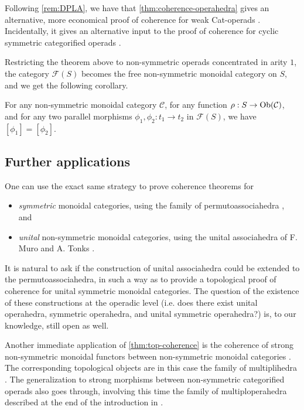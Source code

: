Following \cref{rem:DPLA}, we have that \cref{thm:coherence-operahedra} gives an alternative, more economical proof of coherence for weak Cat-operads \cite[Proposition 14.2]{DP15}.
Incidentally, it gives an alternative input to the proof of coherence for cyclic symmetric categorified operads \cite{curienCategorifiedCyclicOperads2020}.

Restricting the theorem above to non-symmetric operads concentrated in arity $1$, the category $\mathcal{F}(S)$ becomes the free non-symmetric monoidal category on $S$, and we get the following corollary. 

\begin{corollary}
\label{cor:MacLane}
    For any non-symmetric monoidal category $\mathcal{C}$, for any function $\rho : S \to \mathrm{Ob}(\mathcal{C})$, and for any two parallel morphisms $\phi_1,\phi_2: t_1 \to t_2$ in $\mathcal{F}(S)$, we have $[\phi_1]=[\phi_2]$.
\end{corollary}



\subsection{Further applications} 
\label{sec:further}
One can use the exact same strategy to prove coherence theorems for 
\begin{itemize}
    \item \emph{symmetric} monoidal categories, using the family of permutoassociahedra \cite{kapranov1993,reinerCoxeterassociahedra1994}, and
    \item \emph{unital} non-symmetric monoidal categories, using the unital associahedra of F. Muro and A. Tonks \cite{muroUnitalAssociahedra2014}.
\end{itemize}
It is natural to ask if the construction of unital associahedra could be extended to the permutoassociahedra, in such a way as to provide a topological proof of coherence for unital symmetric monoidal categories. 
The question of the existence of these constructions at the operadic level (i.e. does there exist unital operahedra, symmetric operahedra, and unital symmetric operahedra?) is, to our knowledge, still open as well. 

Another immediate application of \cref{thm:top-coherence} is the coherence of strong non-symmetric monoidal functors between non-symmetric monoidal categories \cite{epsteinFunctorsTensoredCategories1966}. 
The corresponding topological objects are in this case the family of multiplihedra \cite{Stasheff70,Forcey08}.
The generalization to strong morphisms between non-symmetric categorified operads also goes through, involving this time the family of multiploperahedra described at the end of the introduction in \cite{MazuirLA22}.

